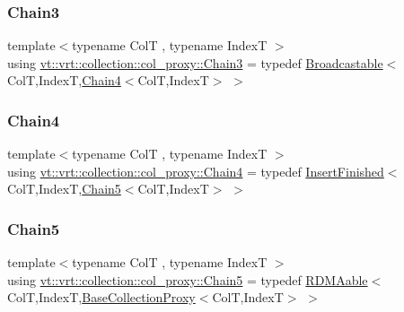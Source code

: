 \subsubsection{\texorpdfstring{Chain3}{Chain3}}
{\footnotesize\ttfamily template$<$typename ColT , typename IndexT $>$ \\
using \hyperlink{namespacevt_1_1vrt_1_1collection_1_1col__proxy_aa83ea97afbf21f975d02b933af0ee42c}{vt\+::vrt\+::collection\+::col\+\_\+proxy\+::\+Chain3} = typedef \hyperlink{structvt_1_1vrt_1_1collection_1_1_broadcastable}{Broadcastable}$<$ColT,IndexT,\hyperlink{namespacevt_1_1vrt_1_1collection_1_1col__proxy_a6fce621c93c2418be67c83af0d94d68f}{Chain4}$<$ColT,IndexT$>$ $>$}

\mbox{\label{namespacevt_1_1vrt_1_1collection_1_1col__proxy_a6fce621c93c2418be67c83af0d94d68f}} 
\subsubsection{\texorpdfstring{Chain4}{Chain4}}
{\footnotesize\ttfamily template$<$typename ColT , typename IndexT $>$ \\
using \hyperlink{namespacevt_1_1vrt_1_1collection_1_1col__proxy_a6fce621c93c2418be67c83af0d94d68f}{vt\+::vrt\+::collection\+::col\+\_\+proxy\+::\+Chain4} = typedef \hyperlink{structvt_1_1vrt_1_1collection_1_1_insert_finished}{Insert\+Finished}$<$ColT,IndexT,\hyperlink{namespacevt_1_1vrt_1_1collection_1_1col__proxy_a96685f5884d57269c5c7dfe14dcc361b}{Chain5}$<$ColT,IndexT$>$ $>$}

\mbox{\label{namespacevt_1_1vrt_1_1collection_1_1col__proxy_a96685f5884d57269c5c7dfe14dcc361b}} 
\subsubsection{\texorpdfstring{Chain5}{Chain5}}
{\footnotesize\ttfamily template$<$typename ColT , typename IndexT $>$ \\
using \hyperlink{namespacevt_1_1vrt_1_1collection_1_1col__proxy_a96685f5884d57269c5c7dfe14dcc361b}{vt\+::vrt\+::collection\+::col\+\_\+proxy\+::\+Chain5} = typedef \hyperlink{structvt_1_1vrt_1_1collection_1_1_r_d_m_aable}{R\+D\+M\+Aable}$<$ColT,IndexT,\hyperlink{structvt_1_1vrt_1_1collection_1_1_base_collection_proxy}{Base\+Collection\+Proxy}$<$ColT,IndexT$>$ $>$}

